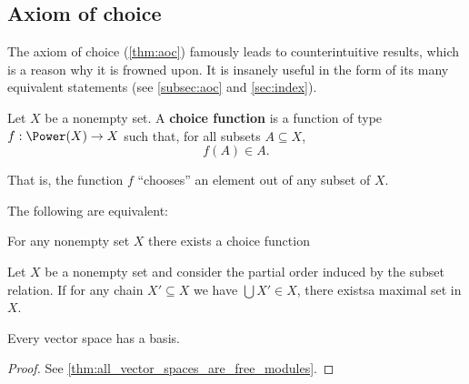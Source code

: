 \subsection{Axiom of choice}\label{subsec:axiom_of_choice}

\begin{remark}\label{remark:aoc}
  The axiom of choice (\cref{thm:aoc}) famously leads to counterintuitive results, which is a reason why it is frowned upon. It is insanely useful in the form of its many equivalent statements (see \cref{subsec:aoc} and \cref{sec:index}).
\end{remark}

\begin{definition}\label{def:choice_function}
  Let \( X \) be a nonempty set. A \textbf{choice function} is a function of type \( f: \Power(X) \to X \) such that, for all subsets \( A \subseteq X \),
  \begin{equation*}
    f(A) \in A.
  \end{equation*}

  That is, the function \( f \) \enquote{chooses} an element out of any subset of \( X \).
\end{definition}

\begin{theorem}\label{thm:aoc}
  The following are equivalent:

  \begin{thmenum}
    \cite[theorem 6M(3)]{Enderton1977} For any nonempty set \( X \) there exists a choice function

    \cite[theorem 6M(6)]{Enderton1977} Let \( X \) be a nonempty set and consider the partial order induced by the subset relation. If for any chain \( X' \subseteq X \) we have \( \bigcup X' \in X \), there exists\AOC a maximal set in \( X \).

     Every vector space has a basis.
  \end{thmenum}
\end{theorem}
\begin{proof}
   See \cref{thm:all_vector_spaces_are_free_modules}.
\end{proof}
